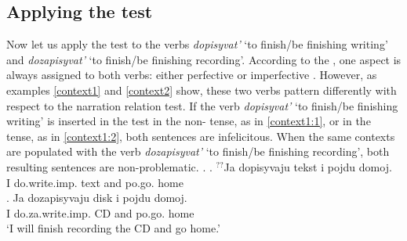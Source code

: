%
%

\subsection{Applying the test}\label{subsection:bi:apply}
Now let us apply the test to the verbs \textit{dopisyvat'} `to finish/be finishing writing' and \textit{dozapisyvat'} `to finish/be finishing recording'. According to the , one aspect is always assigned to both verbs: either perfective \citep{Ramchand:04, Romanova:04, Svenonius:04b} or imperfective \citep{Tatevosov:07, Tatevosov:09}. However, as examples \ref{context1} and \ref{context2} show, these two verbs pattern differently with respect to the narration relation test. If the verb \textit{dopisyvat'} `to finish/be finishing writing' is inserted in the test  in the non- tense, as in \ref{context1:1}, or in the  tense, as in \ref{context1:2}, both sentences are infelicitous. When the same contexts are populated with the verb \textit{dozapisyvat'} `to finish/be finishing recording', both resulting sentences are non-problematic.
\ex.\label{context1} \ag. \label{context1:1}$^{??}$Ja dopisyvaju tekst i pojdu\textsuperscript{\PF} domoj.\\
{}I do.write.imp. text and po.go. home\\
\bg. \label{context2:1}Ja dozapisyvaju disk i pojdu\textsuperscript{\PF} domoj.\\
I do.za.write.imp. CD and po.go. home\\
\trans `I will finish recording the CD and go home.'


